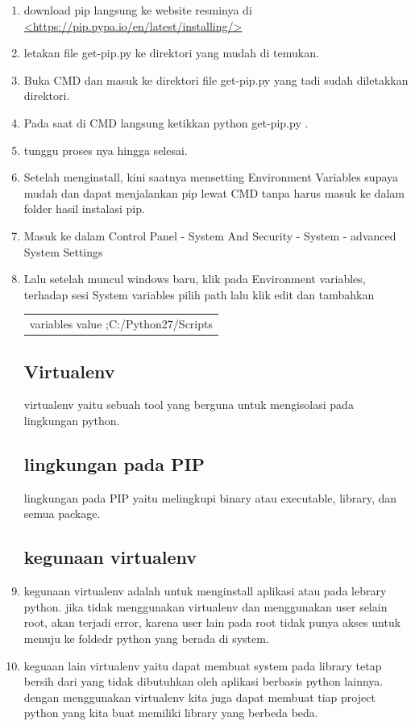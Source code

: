 		\begin{enumerate}
			\item download pip langsung ke website resminya di \url{<https://pip.pypa.io/en/latest/installing/>}
			\item letakan file get-pip.py ke direktori yang mudah di temukan.
			\item Buka CMD dan masuk ke direktori file get-pip.py yang tadi sudah diletakkan direktori.
			\item Pada saat di CMD langsung ketikkan python get-pip.py .
			\item tunggu proses nya hingga selesai.
			\item Setelah menginstall, kini saatnya mensetting Environment Variables supaya mudah dan dapat menjalankan pip lewat CMD tanpa harus masuk ke dalam folder hasil instalasi pip.
			\item Masuk ke dalam Control Panel - System And Security - System - advanced System Settings
			\item Lalu setelah muncul windows baru, klik pada Environment variables, terhadap sesi System variables pilih path lalu klik edit dan tambahkan
				\begin{table}[H]
					\begin{tabular}{|c|}
						\hline
						variables value ;C:/Python27/Scripts\\
					\end{tabular}
				\end{table}
				
	\subsection{Virtualenv}
	virtualenv yaitu sebuah tool yang berguna untuk mengisolasi pada lingkungan python.
	
	\subsection{lingkungan pada PIP}
	lingkungan pada PIP yaitu melingkupi binary atau executable, library, dan semua package.
	
	\subsection{kegunaan virtualenv}
			\item kegunaan virtualenv adalah untuk menginstall aplikasi atau pada lebrary python. jika tidak menggunakan virtualenv dan menggunakan user selain root,
				akan terjadi error, karena user lain pada root tidak punya akses untuk menuju ke foldedr python yang berada di system.
			\item keguaan lain virtualenv yaitu dapat membuat system pada library tetap bersih dari yang tidak dibutuhkan oleh aplikasi berbasis python lainnya.
				dengan menggunakan virtualenv kita juga dapat membuat tiap project python yang kita buat memiliki library yang berbeda beda. 
				  

\end{enumerate}
